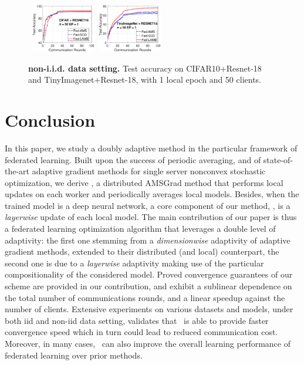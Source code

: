 \documentclass[twoside]{article}
\begin{document}
\begin{figure}[t]
    \begin{center}
        \mbox{
        \hspace{-0.05in}\includegraphics[width=0.25\textwidth]{new_figure/cifar_testerror_resnet18_ep1_client2_iid0.eps}
        \hspace{-0.1in}\includegraphics[width=0.25\textwidth]{new_figure/tinyimagenet_testerror_resnet18_ep1_client2_iid0.eps}
        }
    \end{center}
    \vspace{0.15in}
	\caption{\textbf{non-i.i.d. data setting.} Test accuracy on CIFAR10+Resnet-18 and TinyImagenet+Resnet-18, with 1 local epoch and 50 clients.
	}
	\label{fig:noniidresnet18}
\end{figure}



\section{Conclusion}\label{sec:conclusion}

In this paper, we study a doubly adaptive method in the particular framework of federated learning.
Built upon the success of periodic averaging, and of state-of-the-art adaptive gradient methods for single server nonconvex stochastic optimization, we derive \algo, a distributed AMSGrad method that performs local updates on each worker and periodically averages local models. 
Besides, when the trained model is a deep neural network, a core component of our method, \algo, is a \emph{layerwise} update of each local model.
The main contribution of our paper is thus a federated learning optimization algorithm that leverages a double level of adaptivity: the first one stemming from a \emph{dimensionwise} adaptivity of adaptive gradient methods, extended to their distributed (and local) counterpart, the second one is due to a  \emph{layerwise} adaptivity making use of the particular compositionality of the considered model.
Proved convergence guarantees of our scheme are provided in our contribution, and exhibit a sublinear dependence on the total number of communications rounds, and a linear speedup against the number of clients. Extensive experiments on various datasets and models, under both iid and non-iid data setting, validates that \algo\ is able to provide faster convergence speed which in turn could lead to reduced communication cost. Moreover, in many cases, \algo\ can also improve the overall learning performance of federated learning over prior methods.
\end{document}
